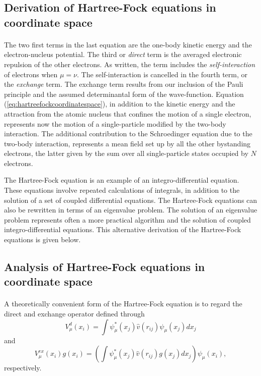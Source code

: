 \documentclass[%
twoside,                 %
final,                   %
10pt]{article}
\begin{document}
\subsection{Derivation of Hartree-Fock equations in coordinate space}

\paragraph{}
The two first terms in the last equation are the one-body kinetic energy and the
electron-nucleus potential. The third or \emph{direct} term is the averaged electronic repulsion of the other
electrons. As written, the
term includes the \emph{self-interaction} of 
electrons when $\mu=\nu$. The self-interaction is cancelled in the fourth
term, or the \emph{exchange} term. The exchange term results from our
inclusion of the Pauli principle and the assumed determinantal form of
the wave-function. Equation (\ref{eq:hartreefockcoordinatespace}), in addition to the kinetic energy and the attraction from the atomic nucleus that confines the motion of a single electron,   represents now the motion of a single-particle modified by the two-body interaction. The additional contribution to the Schroedinger equation due to the two-body interaction, represents a mean field set up by all the other bystanding electrons, the latter given by the sum over all single-particle states occupied by $N$ electrons. 

The Hartree-Fock equation is an example of an integro-differential equation. These equations involve repeated calculations of integrals, in addition to the solution of a set of coupled differential equations. 
The Hartree-Fock equations can also be rewritten in terms of an eigenvalue problem. The solution of an eigenvalue problem represents often a more practical algorithm and the  solution of  coupled  integro-differential equations.
This alternative derivation of the Hartree-Fock equations is given below.




\subsection{Analysis of Hartree-Fock equations in coordinate space}

\paragraph{}
  A theoretically convenient form of the
Hartree-Fock equation is to regard the direct and exchange operator
defined through 
\begin{equation*}
  V_{\mu}^{d}(x_i) = \int \psi_{\mu}^*(x_j) 
 \hat{v}(r_{ij})\psi_{\mu}(x_j) dx_j
\end{equation*}
and
\begin{equation*}
  V_{\mu}^{ex}(x_i) g(x_i) 
  = \left(\int \psi_{\mu}^*(x_j) 
 \hat{v}(r_{ij})g(x_j) dx_j
  \right)\psi_{\mu}(x_i),
\end{equation*}
respectively.
\end{document}
